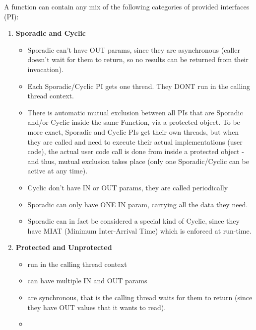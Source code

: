 \documentclass[11pt]{book}
\begin{document}
   A function can contain any mix of the following categories of provided interfaces (PI):
   \begin{enumerate}
         \item \textbf{Sporadic and Cyclic}
            \begin{itemize}
               \item
                  Sporadic can't have OUT params, since they are asynchronous
                  (caller doesn't wait for them to return, so no results can be
                  returned from their invocation).
               \item
                  Each Sporadic/Cyclic PI gets one thread. They DONT run in the calling thread context.
               \item
                  There is automatic mutual exclusion between all PIs that are Sporadic and/or Cyclic 
                  inside the same Function, via a protected object. To be more exact, Sporadic and 
                  Cyclic PIs get their own threads, but when they are called and need to execute their 
                  actual implementations (user code), the actual user code call is done from inside 
                  a protected object - and thus, mutual exclusion takes place 
                  (only one Sporadic/Cyclic can be active at any time). 
               \item
                  Cyclic don't have IN or OUT params, they are called periodically
               \item
                  Sporadic can only have ONE IN param, carrying all the data they need.
               \item
                  Sporadic can in fact be considered a special kind of Cyclic,
                  since they have MIAT (Minimum Inter-Arrival Time) which is enforced at run-time.
            \end{itemize}
         \item \textbf{Protected and Unprotected}
            \begin{itemize}
               \item
                  run in the calling thread context
               \item
                  can have multiple IN and OUT params
               \item
                  are synchronous, that is the calling thread waits 
                  for them to return (since they have OUT values 
                  that it wants to read).
               \item

\end{itemize}
\end{enumerate}
\end{document}
